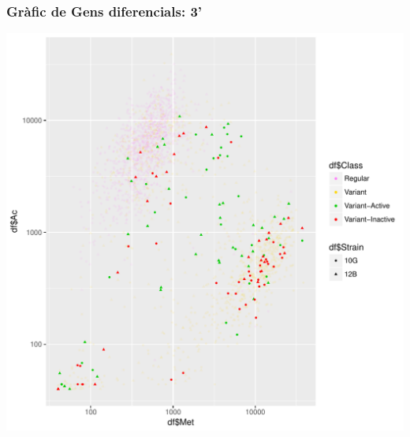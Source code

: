 \documentclass{article}\usepackage[]{graphicx}\usepackage[]{color}
\newenvironment{knitrout}{}{} %
\begin{document}
\subsubsection{Gràfic de Gens diferencials: 3'}
\begin{knitrout}
\color{fgcolor}

{\centering \includegraphics[width=1\linewidth]{figure/minimal-ac_met_log_status_10G_12B_3-1} 

}



\end{knitrout}
\clearpage
\end{document}

